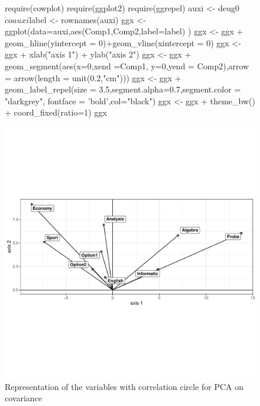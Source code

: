 \documentclass[a4paper,10pt]{article}
\begin{document}
\begin{figure}[H]
\begin{center}
\begin{Schunk}
\begin{Sinput}
  require(cowplot)
  require(ggplot2)
  require(ggrepel)
  auxi <- deug0$co
  auxi$label <- rownames(auxi)
  ggx <- ggplot(data=auxi,aes(Comp1,Comp2,label=label) )
  ggx <- ggx + geom_hline(yintercept = 0)+geom_vline(xintercept = 0)
  ggx <- ggx + xlab("axis 1") + ylab("axis 2")
  ggx <- ggx + geom_segment(aes(x=0,xend =Comp1, y=0,yend = Comp2),arrow = arrow(length = unit(0.2,"cm")))
  ggx <- ggx + geom_label_repel(size = 3.5,segment.alpha=0.7,segment.color = "darkgrey",
                               fontface = 'bold',col="black")
  ggx <- ggx + theme_bw() + coord_fixed(ratio=1)
  ggx
\end{Sinput}
\end{Schunk}
\includegraphics{figs/sweave-coarrow}
\caption{Representation of the variables with correlation circle for PCA on covariance}
\label{fig:coarrow}
\end{center}
\end{figure}
\end{document}
